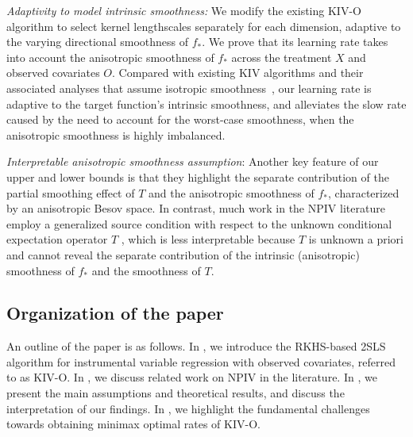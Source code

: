 \documentclass[11pt]{article}
\newcommand{\0}{\mathbf{0}}
\begin{document}
\begin{enumerate}[itemsep=5.0pt,topsep=0pt,leftmargin=*]
{    \item \emph{Adaptivity to model intrinsic smoothness:} We modify the existing KIV-O algorithm to select kernel lengthscales separately for each dimension, adaptive to the varying directional smoothness of $f_\ast$. 
    We prove that its learning rate takes into account the anisotropic smoothness of $f_\ast$
    across the treatment $X$ and observed covariates $O$. 
    Compared with existing KIV algorithms and their associated analyses that assume isotropic smoothness~\citep{fischer2020sobolev,meunier2024nonparametricinstrumentalregressionkernel,singh2023kernel,singh2024kernel}, our learning rate is adaptive to the target function's intrinsic smoothness, and alleviates the slow rate caused by the need to account for the worst-case smoothness, when the anisotropic smoothness is highly imbalanced. 
    \item \emph{Interpretable anisotropic smoothness assumption}: 
    Another key feature of our upper and lower bounds is that they highlight the separate contribution of the partial smoothing effect of $T$ and the anisotropic smoothness of $f_{\ast}$, characterized by an anisotropic Besov space. 
    In contrast, much work in the NPIV literature employ a generalized source condition with respect to the unknown conditional expectation operator $T$ \citep{engl1996regularization, singh2019kernel, mastouri2021proximal, singh2023kernel, bozkurt2025densityratiobasedproxycausal,HallHorowitz2005}, which is less interpretable because $T$ is unknown a priori and cannot reveal the separate contribution of the intrinsic (anisotropic) smoothness of $f_{\ast}$ and the smoothness of $T$. 
    }

    \end{enumerate}


\subsection{Organization of the paper}
An outline of the paper is as follows. 
In , we introduce the RKHS-based 2SLS algorithm for instrumental variable
regression with observed covariates, referred to as KIV-O.
In , we discuss related work on NPIV in the literature.
In , we present the main assumptions and theoretical results, and discuss the interpretation of our findings.
In , we highlight the fundamental challenges towards obtaining minimax optimal rates of KIV-O.

\end{document}
